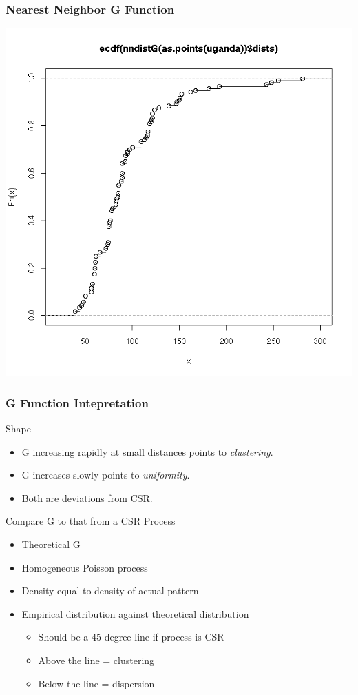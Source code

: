 \documentclass[nototal,handout]{beamer}
\begin{document}
\begin{frame}[<+->]
    \frametitle{Nearest Neighbor G Function}
    \begin{center}
      \includegraphics[width=.65\linewidth]{nng.png}
    \end{center}
  \end{frame}
  \begin{frame}[<+->]

    \frametitle{G Function Intepretation}
    \begin{block}{Shape}
      \begin{itemize}
	\item G increasing rapidly at small distances points to
	  \emph{clustering}.
	\item G increases slowly points to \emph{uniformity}.
	\item Both are deviations from CSR.
      \end{itemize}
     \end{block}
\begin{block}{Compare G to that from a CSR Process}
      \begin{itemize}
	\item Theoretical G
	    \item Homogeneous Poisson process
	    \item Density equal to density of actual pattern
	\item Empirical distribution against theoretical distribution
	  \begin{itemize}
	    \item Should be a 45 degree line if process is CSR
	    \item Above the line = clustering
	    \item Below the line = dispersion
	  \end{itemize}
      \end{itemize}
     \end{block}


   \end{frame}
\end{document}
